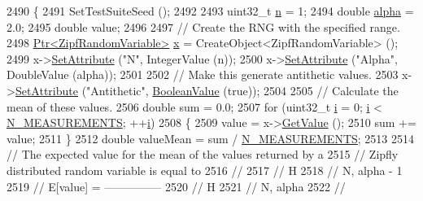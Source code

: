 \begin{DoxyCode}
2490 \{
2491   SetTestSuiteSeed ();
2492 
2493   uint32\_t \hyperlink{namespacesample-rng-plot_aeb5ee5c431e338ef39b7ac5431242e1d}{n} = 1;
2494   \textcolor{keywordtype}{double} \hyperlink{lte__uplink__power__control_8m_a62197192f0fbf4e0675eb37be1c4c175}{alpha} = 2.0;
2495   \textcolor{keywordtype}{double} value;
2496 
2497   \textcolor{comment}{// Create the RNG with the specified range.}
2498   \hyperlink{classns3_1_1Ptr}{Ptr<ZipfRandomVariable>} \hyperlink{lte__link__budget__x2__handover__measures_8m_a9336ebf25087d91c818ee6e9ec29f8c1}{x} = CreateObject<ZipfRandomVariable> ();
2499   x->\hyperlink{classns3_1_1ObjectBase_ac60245d3ea4123bbc9b1d391f1f6592f}{SetAttribute} (\textcolor{stringliteral}{"N"}, IntegerValue (n));
2500   x->\hyperlink{classns3_1_1ObjectBase_ac60245d3ea4123bbc9b1d391f1f6592f}{SetAttribute} (\textcolor{stringliteral}{"Alpha"}, DoubleValue (alpha));
2501 
2502   \textcolor{comment}{// Make this generate antithetic values.}
2503   x->\hyperlink{classns3_1_1ObjectBase_ac60245d3ea4123bbc9b1d391f1f6592f}{SetAttribute} (\textcolor{stringliteral}{"Antithetic"}, \hyperlink{classns3_1_1BooleanValue}{BooleanValue} (\textcolor{keyword}{true}));
2504 
2505   \textcolor{comment}{// Calculate the mean of these values.}
2506   \textcolor{keywordtype}{double} sum = 0.0;
2507   \textcolor{keywordflow}{for} (uint32\_t \hyperlink{bernuolliDistribution_8m_a6f6ccfcf58b31cb6412107d9d5281426}{i} = 0; \hyperlink{bernuolliDistribution_8m_a6f6ccfcf58b31cb6412107d9d5281426}{i} < \hyperlink{classRandomVariableStreamZipfAntitheticTestCase_aa6e592d5004d13804492847b87c51adb}{N\_MEASUREMENTS}; ++\hyperlink{bernuolliDistribution_8m_a6f6ccfcf58b31cb6412107d9d5281426}{i})
2508     \{
2509       value = x->\hyperlink{classns3_1_1ZipfRandomVariable_a327ce77bd92ece90f8622b5104850676}{GetValue} ();
2510       sum += value;
2511     \}
2512   \textcolor{keywordtype}{double} valueMean = sum / \hyperlink{classRandomVariableStreamZipfAntitheticTestCase_aa6e592d5004d13804492847b87c51adb}{N\_MEASUREMENTS};
2513 
2514   \textcolor{comment}{// The expected value for the mean of the values returned by a}
2515   \textcolor{comment}{// Zipfly distributed random variable is equal to }
2516   \textcolor{comment}{//}
2517   \textcolor{comment}{//                   H}
2518   \textcolor{comment}{//                    N, alpha - 1}
2519   \textcolor{comment}{//     E[value]  =  ---------------}
2520   \textcolor{comment}{//                     H}
2521   \textcolor{comment}{//                      N, alpha}
2522   \textcolor{comment}{//                          }

\end{DoxyCode}
